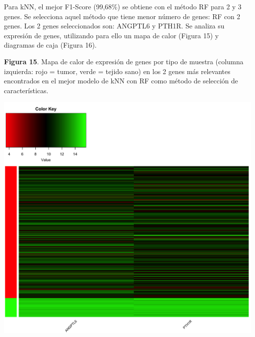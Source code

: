 Para kNN, el mejor F1-Score (99,68\%) se obtiene con el método RF para 2 y 3 genes. Se selecciona aquel método que tiene menor número de genes: RF con 2 genes. Los 2 genes seleccionados son: ANGPTL6 y PTH1R. Se analiza su expresión de genes, utilizando para ello un mapa de calor (Figura 15) y diagramas de caja (Figura 16).

\newpage
\begin{center}
\textbf{Figura 15}. Mapa de calor de expresión de genes por tipo de muestra (columna izquierda: rojo = tumor, verde = tejido sano) en los 2 genes más relevantes encontrados en el mejor modelo de kNN con RF como método de selección de características.
\end{center}
\begin{center}
	\includegraphics[width=1\textwidth]{figuras/15_higado_biclase_42_knn_heatmap_mejor_metodo.png} 
\end{center}

